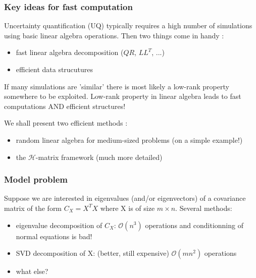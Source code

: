 
\begin{frame}
\frametitle{Key ideas for fast computation}
Uncertainty quantification (UQ) typically requires a high number of simulations using basic linear algebra operations. Then two things come in handy :

  \begin{itemize}
    \item fast linear algebra decomposition ($QR$, $LL^T$, ...)
    \item efficient data strucutures
  \end{itemize}

If many simulations are 'similar' there is most likely a low-rank property somewhere to be exploited. Low-rank property in linear algebra leads to fast computations AND efficient structures!

We shall present two efficient methods :
  \begin{itemize}
    \item random linear algebra for medium-sized problems (on a simple example!)
    \item the $\mathcal{H}$-matrix framework (much more detailed)
  \end{itemize}
\end{frame}


\begin{frame}
\frametitle{Model problem}
Suppose we are interested in eigenvalues (and/or eigenvectors) of a covariance matrix of the form $C_X = X^TX$ where X is of size $m \times n$.
Several methods:
  \begin{itemize}
    \item eigenvalue decomposition of $C_X$: $\mathcal{O}(n^3)$ operations and conditionning of normal equations is bad!
    \item SVD decomposition of X: (better, still expensive) $\mathcal{O}(mn^2)$ operations
    \item \alert{what else?}
  \end{itemize}
\end{frame}

